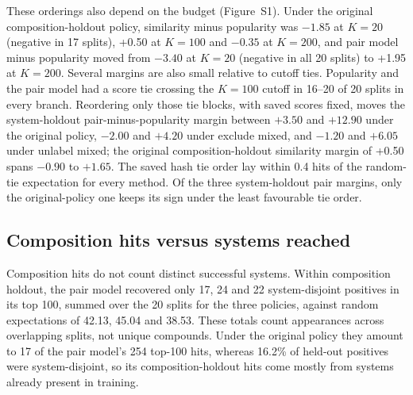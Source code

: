 \documentclass[11pt,a4paper]{article}
\begin{document}
These orderings also depend on the budget (Figure~S1). Under the original composition-holdout policy, similarity minus popularity was $-1.85$ at $K=20$ (negative in 17 splits), +0.50 at $K=100$ and $-0.35$ at $K=200$, and pair model minus popularity moved from $-3.40$ at $K=20$ (negative in all 20 splits) to +1.95 at $K=200$. Several margins are also small relative to cutoff ties. Popularity and the pair model had a score tie crossing the $K=100$ cutoff in 16--20 of 20 splits in every branch. Reordering only those tie blocks, with saved scores fixed, moves the system-holdout pair-minus-popularity margin between $+3.50$ and $+12.90$ under the original policy, $-2.00$ and $+4.20$ under exclude mixed, and $-1.20$ and $+6.05$ under unlabel mixed; the original composition-holdout similarity margin of +0.50 spans $-0.90$ to $+1.65$. The saved hash tie order lay within 0.4 hits of the random-tie expectation for every method. Of the three system-holdout pair margins, only the original-policy one keeps its sign under the least favourable tie order.

\subsection{Composition hits versus systems reached}
Composition hits do not count distinct successful systems. Within composition holdout, the pair model recovered only 17, 24 and 22 system-disjoint positives in its top 100, summed over the 20 splits for the three policies, against random expectations of 42.13, 45.04 and 38.53. These totals count appearances across overlapping splits, not unique compounds. Under the original policy they amount to 17 of the pair model's 254 top-100 hits, whereas 16.2\% of held-out positives were system-disjoint, so its composition-holdout hits come mostly from systems already present in training.
\end{document}
